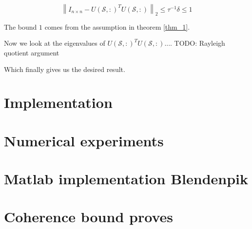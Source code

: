 \documentclass{article}
\begin{document}
\begin{equation} \label{eq_intermed4}
\left\|I_{n \times n}-U(\mathcal{S},:)^TU(\mathcal{S},:)\right\|_{2} \le \tau^{-1}\delta \le 1 
\end{equation}

The bound $1$ comes from the assumption in theorem \ref{thm_1}.

Now we look at the eigenvalues of $U(\mathcal{S},:)^TU(\mathcal{S},:)$....
TODO: Rayleigh quotient argument


Which finally gives us the desired result.


\section{Implementation} \label{impl}

\section{Numerical experiments} \label{num_exp}

 


\appendix
\section{Matlab implementation Blendenpik} \label{app_code}
\section{Coherence bound proves} \label{app_coh}
\end{document}

